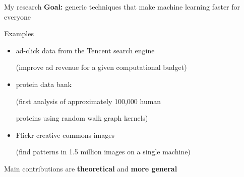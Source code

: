 \begin{frame}{My research}
\textbf{Goal:} 
generic techniques that make machine learning faster for everyone


\pause
\vspace{0.15in}
Examples
\begin{itemize}
\item
ad-click data from the Tencent search engine

(improve ad revenue for a given computational budget)

\vspace{-1.5cm}

\pause
\item
protein data bank

(first analysis of approximately 100,000 human 

proteins using random walk graph kernels)

\vspace{-1.5cm}

\pause
\vspace{-0.4cm}
\item
Flickr creative commons images

(find patterns in 1.5 million images on a single machine)
\end{itemize}

\vspace{-0.8cm}

\pause
\vspace{-0.15in}
Main contributions are \textbf{theoretical} and \textbf{more general}
\end{frame}
